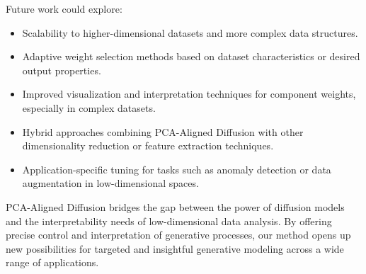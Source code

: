 \documentclass{article} %
\begin{document}
Future work could explore:
\begin{itemize}
    \item Scalability to higher-dimensional datasets and more complex data structures.
    \item Adaptive weight selection methods based on dataset characteristics or desired output properties.
    \item Improved visualization and interpretation techniques for component weights, especially in complex datasets.
    \item Hybrid approaches combining PCA-Aligned Diffusion with other dimensionality reduction or feature extraction techniques.
    \item Application-specific tuning for tasks such as anomaly detection or data augmentation in low-dimensional spaces.
\end{itemize}

PCA-Aligned Diffusion bridges the gap between the power of diffusion models and the interpretability needs of low-dimensional data analysis. By offering precise control and interpretation of generative processes, our method opens up new possibilities for targeted and insightful generative modeling across a wide range of applications.



\end{document}
